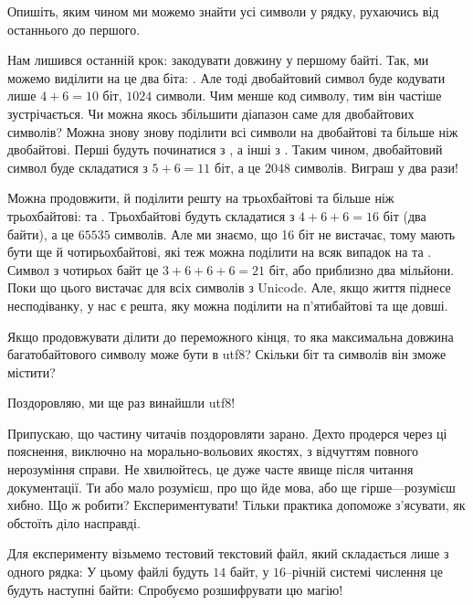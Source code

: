 \begin{exercise}
Опишіть, яким чином ми можемо знайти усі символи у рядку, рухаючись від останнього до першого.
\end{exercise}

Нам лишився останній крок: закодувати довжину у першому байті.
Так, ми можемо виділити на це два біта: .
Але тоді двобайтовий символ буде кодувати лише $4+6=10$ біт, $1024$ символи.
Чим менше код символу, тим він частіше зустрічається.
Чи можна якось збільшити діапазон саме для двобайтових символів?
Можна знову знову поділити всі символи на двобайтові та більше ніж двобайтові.
Перші будуть починатися з , а інші з .
Таким чином, двобайтовий символ буде складатися з $5+6=11$ біт, а це $2048$ символів.
Виграш у два рази!

Можна продовжити, й поділити решту на трьохбайтові та більше ніж трьохбайтові:  та .
Трьохбайтові будуть складатися з $4+6+6=16$ біт (два байти), а це $65535$ символів.
Але ми знаємо, що 16 біт не вистачає, тому мають бути ще й чотирьохбайтові, які теж можна поділити на всяк випадок на  та .
Символ з чотирьох байт це $3+6+6+6=21$ біт, або приблизно два мільйони.
Поки що цього вистачає для всіх символів з Unicode.
Але, якщо життя піднесе несподіванку, у нас є решта, яку можна поділити на п'ятибайтові та ще довші.

\begin{exercise}
Якщо продовжувати ділити до переможного кінця, то яка максимальна довжина багатобайтового символу може бути в utf8?
Скільки біт та символів він зможе містити?
\end{exercise}

Поздоровляю, ми ще раз винайшли utf8!

\medskip

Припускаю, що частину читачів поздоровляти зарано.
Дехто продерся через ці пояснення, виключно на морально-вольових якостях, з відчуттям повного нерозуміння справи.
Не хвилюйтесь, це дуже часте явище після читання документації.
Ти або мало розумієш, про що йде мова, або ще гірше---розумієш хибно.
Що ж робити? Експериментувати!
Тільки практика допоможе з'ясувати, як обстоїть діло насправді.

Для експерименту візьмемо тестовий текстовий файл, який складається лише з одного рядка:
\noindent У цьому файлі будуть $14$ байт, у $16$--річній системі числення це будуть наступні байти:
\noindent Спробуємо розшифрувати цю магію!

